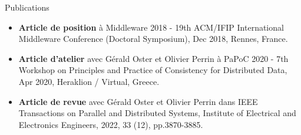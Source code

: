 \begin{frame}{Publications}
    \begin{itemize}
        \item \textbf{Article de position} à Middleware 2018 - 19th ACM/IFIP International Middleware Conference (Doctoral Symposium), Dec 2018, Rennes, France.
        \item \textbf{Article d'atelier} avec Gérald Oster et Olivier Perrin à PaPoC 2020 - 7th Workshop on Principles and Practice of Consistency for Distributed Data, Apr 2020, Heraklion / Virtual, Greece.
        \item \textbf{Article de revue} avec Gérald Oster et Olivier Perrin dans IEEE Transactions on Parallel and Distributed Systems, Institute of Electrical and Electronics Engineers, 2022, 33 (12), pp.3870-3885.
    \end{itemize}
\end{frame}

